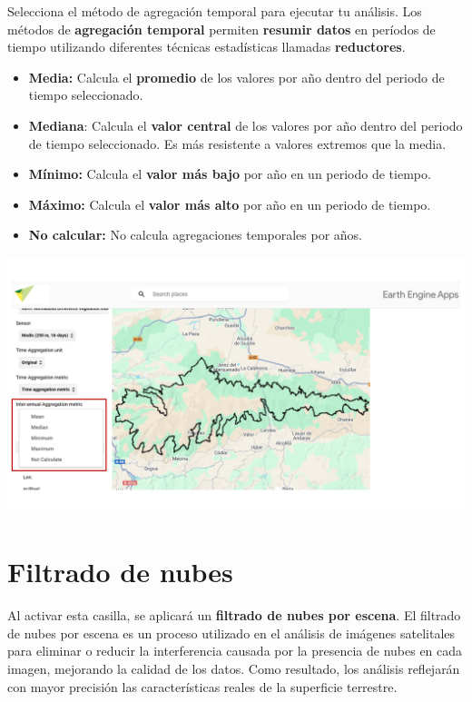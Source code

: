 \documentclass[
]{book}
\providecommand{\tightlist}{%
  \setlength{\itemsep}{0pt}\setlength{\parskip}{0pt}}
\begin{document}
Selecciona el método de agregación temporal para ejecutar tu análisis. Los métodos de \textbf{agregación temporal} permiten \textbf{resumir datos} en períodos de tiempo utilizando diferentes técnicas estadísticas llamadas \textbf{reductores}.

\begin{itemize}
\tightlist
\item
  \textbf{Media:} Calcula el \textbf{promedio} de los valores por año dentro del periodo de tiempo seleccionado.\\
\item
  \textbf{Mediana}: Calcula el \textbf{valor central} de los valores por año dentro del periodo de tiempo seleccionado. Es más resistente a valores extremos que la media.\\
\item
  \textbf{Mínimo:} Calcula el \textbf{valor más bajo} por año en un periodo de tiempo.\\
\item
  \textbf{Máximo:} Calcula el \textbf{valor más alto} por año en un periodo de tiempo.\\
\item
  \textbf{No calcular:} No calcula agregaciones temporales por años.
\end{itemize}

\includegraphics{assets/interannualAggregation.png}

\chapter{Filtrado de nubes}\label{filtrado-nubes}

Al activar esta casilla, se aplicará un \textbf{filtrado de nubes por escena}. El filtrado de nubes por escena es un proceso utilizado en el análisis de imágenes satelitales para eliminar o reducir la interferencia causada por la presencia de nubes en cada imagen, mejorando la calidad de los datos. Como resultado, los análisis reflejarán con mayor precisión las características reales de la superficie terrestre.
\end{document}
